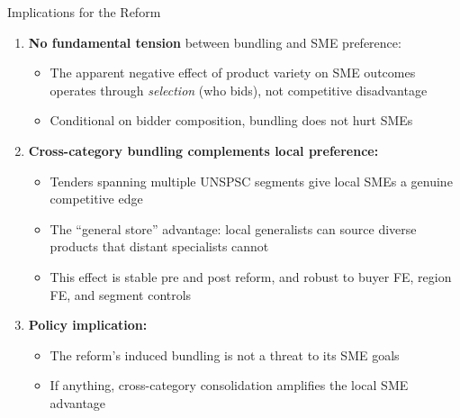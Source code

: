 \documentclass[9pt,aspectratio=169]{beamer}
\begin{document}
\begin{frame}{Implications for the Reform}
\begin{enumerate}
  \item \textbf{No fundamental tension} between bundling and SME preference:
  \begin{itemize}
    \item The apparent negative effect of product variety on SME outcomes operates through \textit{selection} (who bids), not competitive disadvantage
    \item Conditional on bidder composition, bundling does not hurt SMEs
  \end{itemize}

  \bigskip
  \item \textbf{Cross-category bundling complements local preference:}
  \begin{itemize}
    \item Tenders spanning multiple UNSPSC segments give local SMEs a genuine competitive edge
    \item The ``general store'' advantage: local generalists can source diverse products that distant specialists cannot
    \item This effect is stable pre and post reform, and robust to buyer FE, region FE, and segment controls
  \end{itemize}

  \bigskip
  \item \textbf{Policy implication:}
  \begin{itemize}
    \item The reform's induced bundling is not a threat to its SME goals
    \item If anything, cross-category consolidation amplifies the local SME advantage
  \end{itemize}
\end{enumerate}
\end{frame}
\end{document}
